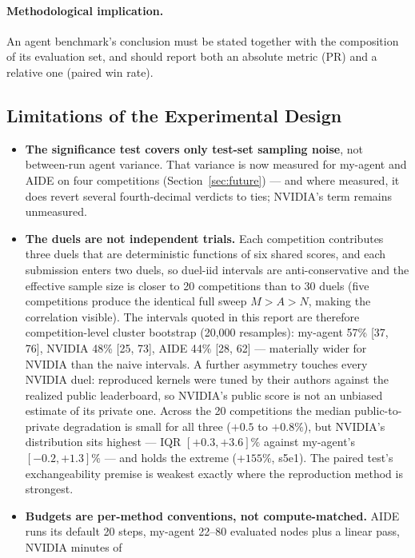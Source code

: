 \documentclass[11pt,a4paper]{article}
\newcommand{\M}{M}   %
\newcommand{\N}{N}   %
\newcommand{\A}{A}   %
\begin{document}
\paragraph{Methodological implication.} An agent benchmark's conclusion must be stated together with the composition of its evaluation set, and should report both an absolute metric (PR) and a relative one (paired win rate).

\subsection{Limitations of the Experimental Design}
\label{sec:limitations}

\begin{itemize}[leftmargin=*]
  \item \textbf{The significance test covers only test-set sampling noise}, not between-run agent variance. That variance is now measured for my-agent and AIDE on four competitions (Section~\ref{sec:future}) --- and where measured, it does revert several fourth-decimal verdicts to ties; NVIDIA's term remains unmeasured.
  \item \textbf{The duels are not independent trials.} Each competition contributes three
  duels that are deterministic functions of six shared scores, and each submission enters two
  duels, so duel-iid intervals are anti-conservative and the effective sample size is closer to 20
  competitions than to 30 duels (five competitions produce the identical full sweep
  $\M > \A > \N$, making the correlation visible). The intervals quoted in this report are
  therefore competition-level cluster bootstrap (20{,}000 resamples): my-agent 57\% [37, 76],
  NVIDIA 48\% [25, 73], AIDE 44\% [28, 62] --- materially wider for NVIDIA than the naive
  intervals. A further asymmetry touches every NVIDIA duel: reproduced kernels were tuned by
  their authors against the realized public leaderboard, so NVIDIA's public score is not an
  unbiased estimate of its private one. Across the 20 competitions the median public-to-private
  degradation is small for all three ($+0.5$ to $+0.8\%$), but NVIDIA's distribution sits
  highest --- IQR $[+0.3, +3.6]\%$ against my-agent's $[-0.2, +1.3]\%$ --- and holds the
  extreme ($+155\%$, s5e1). The paired test's exchangeability premise is weakest exactly where
  the reproduction method is strongest.
  \item \textbf{Budgets are per-method conventions, not compute-matched.} AIDE runs its
  default 20 steps, my-agent 22--80 evaluated nodes plus a linear pass, NVIDIA minutes of

\end{itemize}
\end{document}
